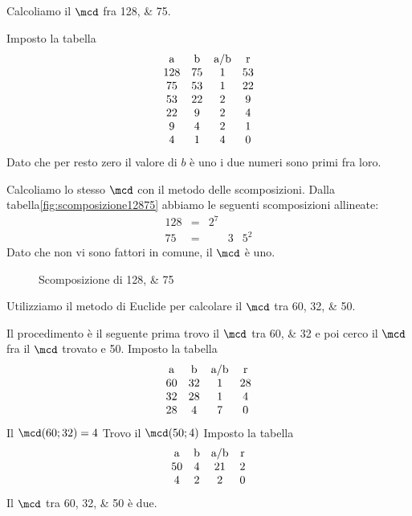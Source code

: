 \begin{esempiot}{}{}
Calcoliamo il $\mcd$ fra \numlist{128;75}. 
   \end{esempiot}
Imposto la tabella
  \[
   \begin{array}{cccc}
   	   $a$&$b$&$a/b$&$r$\\
   	   	128 & 75 & 1 & 53\\
   	   	75 & 53 & 1 & 22\\
   	   	53 & 22 & 2 & 9\\
   	   	22 & 9 &2 & 4\\
   	   	9 & 4 & 2 & 1\\
   	   	4 & 1 & 4& 0
   	    \end{array} 
   	     \]
   	    Dato che per resto zero il valore di $b$ è uno i due numeri sono primi fra loro. 
   	    
   	    Calcoliamo lo stesso $\mcd$ con il metodo delle scomposizioni. 
   	    Dalla tabella\nobs\vref{fig:scomposizione12875} abbiamo le seguenti scomposizioni allineate:
   	      \[
   	       \begin{array}{rclll}
   	       128& = & 2^7&   &    \\
   	       75 & = &    & 3 & 5^2 
   	       \end{array}
   	       \]
   	  Dato che non vi sono fattori in comune, il $\mcd$ è uno.
  \begin{figure}
   	        	\centering
   	    
   	        	\caption[]{Scomposizione di \numlist{128;75}}
   	        	\label{fig:scomposizione12875}
   	        \end{figure}
\begin{esempiot}{}{}
Utilizziamo il metodo di Euclide per calcolare il $\mcd$ tra \numlist{60;32;50}. 
\end{esempiot}
Il procedimento è il seguente prima trovo il $\mcd$ tra \numlist{60;32} e poi cerco il $\mcd$ fra il $\mcd$ trovato e \num{50}.
Imposto la tabella
  \[
   \begin{array}{cccc}
   	   $a$&$b$&$a/b$&$r$\\
   	   	60 & 32 & 1 & 28\\
   	   	32 & 28 & 1 & 4\\
   	   	28 & 4 & 7 & 0
   	   \end{array} 
   	     \]
   Il $\mcd(60;32)=4$
 Trovo il $\mcd(50;4)$
 Imposto la tabella
   \[
     \begin{array}{cccc}
     	   $a$&$b$&$a/b$&$r$\\
     	   	50 & 4 & 21 & 2\\
     	   	4 & 2 & 2 & 0
     	   \end{array} 
     	     \]
     Il $\mcd$ tra \numlist{60;32;50} è due.
